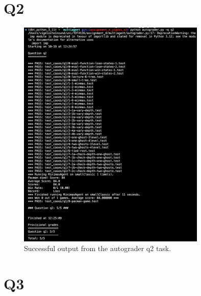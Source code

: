 \documentclass{article}
\begin{document}
    \mainmatter

    \section*{Q2}

    \begin{figure}[H]
        \centering
        \includegraphics[width=0.8\textwidth]{Images/test_q2.png}
        \caption[Q2 test output]{Successful output from the autograder q2 task.}
        \label{fig:Q2 test output}
    \end{figure}

    \section*{Q3}
\end{document}
